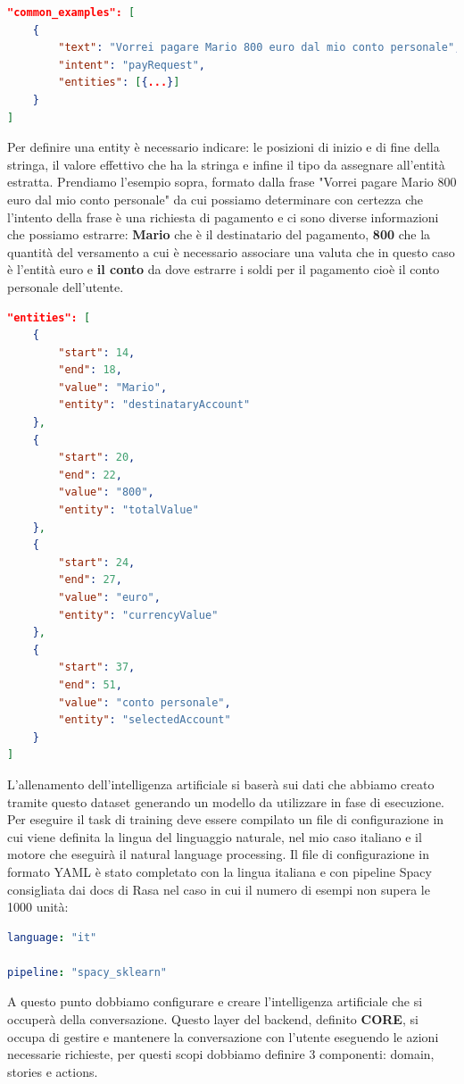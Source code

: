 \begin{lstlisting}[language=json,firstnumber=1]
"common_examples": [
    {
        "text": "Vorrei pagare Mario 800 euro dal mio conto personale",
        "intent": "payRequest",
        "entities": [{...}]
    }
]
\end{lstlisting}
Per definire una entity è necessario indicare: le posizioni di inizio e di fine della stringa, il valore effettivo che ha la stringa e infine il tipo da assegnare all'entità estratta.
Prendiamo l'esempio sopra, formato dalla frase "Vorrei pagare Mario 800 euro dal mio conto personale" da cui possiamo determinare con certezza che l'intento della frase è una richiesta di pagamento e ci sono diverse informazioni che possiamo estrarre: \textbf{Mario} che è il destinatario del pagamento, \textbf{800} che la quantità del versamento a cui è necessario associare una valuta che in questo caso è l'entità euro e \textbf{il conto} da dove estrarre i soldi per il pagamento cioè il conto personale dell'utente.
\begin{lstlisting}[language=json,firstnumber=1]
"entities": [
    {
        "start": 14,
        "end": 18,
        "value": "Mario",
        "entity": "destinataryAccount"
    },
    {
        "start": 20,
        "end": 22,
        "value": "800",
        "entity": "totalValue"
    },
    {
        "start": 24,
        "end": 27,
        "value": "euro",
        "entity": "currencyValue"
    },
    {
        "start": 37,
        "end": 51,
        "value": "conto personale",
        "entity": "selectedAccount"
    }
]
\end{lstlisting}
L'allenamento dell'intelligenza artificiale si baserà sui dati che abbiamo creato tramite questo dataset generando un modello da utilizzare in fase di esecuzione. Per eseguire il task di training deve essere compilato un file di configurazione in cui viene definita la lingua del linguaggio naturale, nel mio caso italiano e il motore che eseguirà il natural language processing.
Il file di configurazione in formato YAML è stato completato con la lingua italiana e con pipeline Spacy consigliata dai docs di Rasa nel caso in cui il numero di esempi non supera le 1000 unità:
\begin{lstlisting}[language=yaml]
language: "it"

pipeline: "spacy_sklearn"
\end{lstlisting}
A questo punto dobbiamo configurare e creare l'intelligenza artificiale che si occuperà della conversazione.
Questo layer del backend, definito \textbf{CORE}, si occupa di gestire e mantenere la conversazione con l'utente eseguendo le azioni necessarie richieste, per questi scopi dobbiamo definire 3 componenti: domain, stories e actions.
